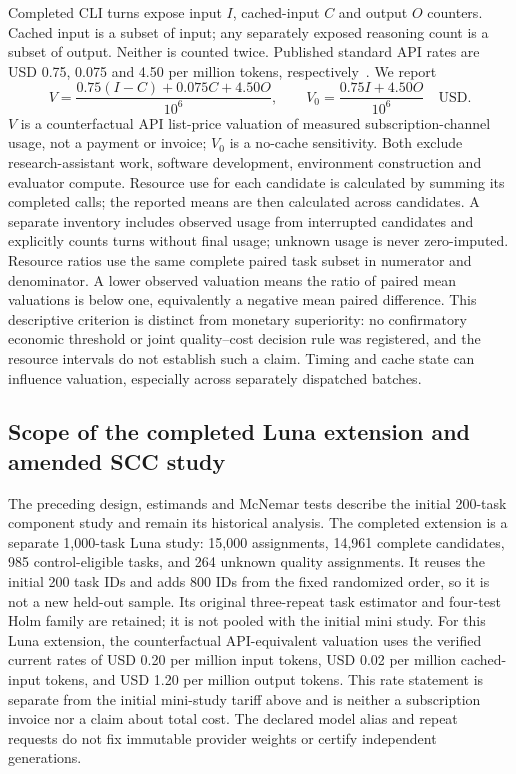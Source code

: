 Completed CLI turns expose input $I$, cached-input $C$ and output $O$ counters. Cached input is a subset of input; any separately exposed reasoning count is a subset of output. Neither is counted twice. Published standard API rates are USD 0.75, 0.075 and 4.50 per million tokens, respectively~\cite{openaipricing2026}. We report
\begin{equation}
V=\frac{0.75(I-C)+0.075C+4.50O}{10^6},\qquad
V_0=\frac{0.75I+4.50O}{10^6}\quad\mathrm{USD}.
\end{equation}
$V$ is a counterfactual API list-price valuation of measured subscription-channel usage, not a payment or invoice; $V_0$ is a no-cache sensitivity. Both exclude research-assistant work, software development, environment construction and evaluator compute. Resource use for each candidate is calculated by summing its completed calls; the reported means are then calculated across candidates. A separate inventory includes observed usage from interrupted candidates and explicitly counts turns without final usage; unknown usage is never zero-imputed. Resource ratios use the same complete paired task subset in numerator and denominator. A lower observed valuation means the ratio of paired mean valuations is below one, equivalently a negative mean paired difference. This descriptive criterion is distinct from monetary superiority: no confirmatory economic threshold or joint quality--cost decision rule was registered, and the resource intervals do not establish such a claim. Timing and cache state can influence valuation, especially across separately dispatched batches.

\subsection{Scope of the completed Luna extension and amended SCC study}
The preceding design, estimands and McNemar tests describe the initial 200-task component study and remain its historical analysis. The completed extension is a separate 1,000-task Luna study: 15,000 assignments, 14,961 complete candidates, 985 control-eligible tasks, and 264 unknown quality assignments. It reuses the initial 200 task IDs and adds 800 IDs from the fixed randomized order, so it is not a new held-out sample. Its original three-repeat task estimator and four-test Holm family are retained; it is not pooled with the initial mini study.
For this Luna extension, the counterfactual API-equivalent valuation uses the verified current rates of USD 0.20 per million input tokens, USD 0.02 per million cached-input tokens, and USD 1.20 per million output tokens. This rate statement is separate from the initial mini-study tariff above and is neither a subscription invoice nor a claim about total cost. The declared model alias and repeat requests do not fix immutable provider weights or certify independent generations.

